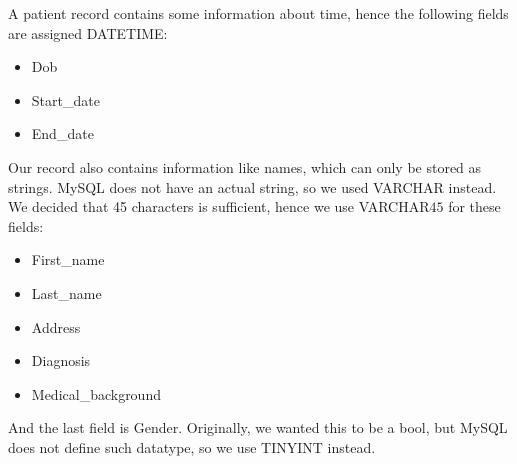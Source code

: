 \documentclass[a4paper]{article}
\numberwithin{equation}{section}
\begin{document}
A patient record contains some information about time, hence the following fields are assigned DATETIME:
\begin{itemize}
    \item Dob
    \item Start\_date
    \item End\_date
\end{itemize}

Our record also contains information like names, which can only be stored as strings. MySQL does not have an actual string, so we used VARCHAR instead.
We decided that 45 characters is sufficient, hence we use VARCHAR\(45\) for these fields:
\begin{itemize}
    \item First\_name
    \item Last\_name
    \item Address
    \item Diagnosis
    \item Medical\_background
\end{itemize}

And the last field is Gender.
Originally, we wanted this to be a bool, but MySQL does not define such datatype, so we use TINYINT instead.
\end{document}
